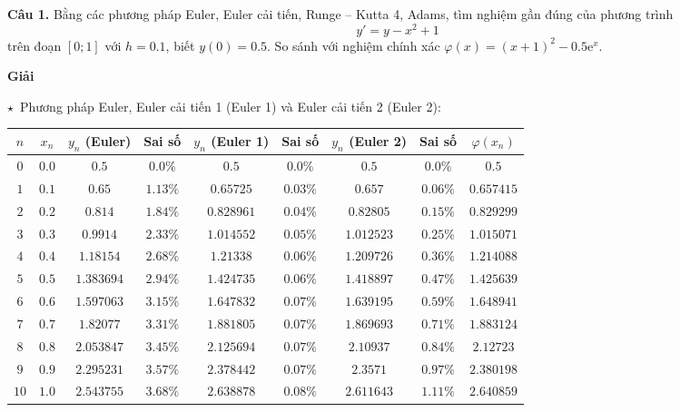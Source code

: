 \textbf{Câu 1.} Bằng các phương pháp Euler, Euler cải tiến, Runge – Kutta 4, Adams, tìm nghiệm gần đúng của phương trình $$y'=y-x^2+1$$ trên đoạn $[0;1]$ với $h=0.1$, biết $y(0)=0.5$. So sánh với nghiệm chính xác $\varphi(x)=(x+1)^2-0.5\mathrm{e}^x$.\par
\textbf{Giải}\par
$\star$~Phương pháp Euler, Euler cải tiến 1 (Euler 1) và Euler cải tiến 2 (Euler 2):
\begin{longtable}{|c|c|c|c|c|c|c|c|c|}\hline
	$n$  & $x_n$ & $y_n$ (Euler) & Sai số & $y_n$ (Euler 1) & Sai số & $y_n$ (Euler 2)     & Sai số   & $\varphi(x_n)$ \\\hline
	\endhead
	$0$  & $0.0$ & $0.5$         & $0.0\%$  & $0.5$           & $0.0\%$  & $0.5$           & $0.0\%$  & $0.5$          \\\hline
	$1$  & $0.1$ & $0.65$        & $1.13\%$ & $0.65725$       & $0.03\%$ & $0.657$         & $0.06\%$ & $0.657415$     \\\hline
	$2$  & $0.2$ & $0.814$       & $1.84\%$ & $0.828961$      & $0.04\%$ & $0.82805$       & $0.15\%$ & $0.829299$     \\\hline
	$3$  & $0.3$ & $0.9914$      & $2.33\%$ & $1.014552$      & $0.05\%$ & $1.012523$      & $0.25\%$ & $1.015071$     \\\hline
	$4$  & $0.4$ & $1.18154$     & $2.68\%$ & $1.21338$       & $0.06\%$ & $1.209726$      & $0.36\%$ & $1.214088$     \\\hline
	$5$  & $0.5$ & $1.383694$    & $2.94\%$ & $1.424735$      & $0.06\%$ & $1.418897$      & $0.47\%$ & $1.425639$     \\\hline
	$6$  & $0.6$ & $1.597063$    & $3.15\%$ & $1.647832$      & $0.07\%$ & $1.639195$      & $0.59\%$ & $1.648941$     \\\hline
	$7$  & $0.7$ & $1.82077$     & $3.31\%$ & $1.881805$      & $0.07\%$ & $1.869693$      & $0.71\%$ & $1.883124$     \\\hline
	$8$  & $0.8$ & $2.053847$    & $3.45\%$ & $2.125694$      & $0.07\%$ & $2.10937$       & $0.84\%$ & $2.12723$      \\\hline
	$9$  & $0.9$ & $2.295231$    & $3.57\%$ & $2.378442$      & $0.07\%$ & $2.3571$        & $0.97\%$ & $2.380198$     \\\hline
	$10$ & $1.0$ & $2.543755$    & $3.68\%$ & $2.638878$      & $0.08\%$ & $2.611643$      & $1.11\%$ & $2.640859$     \\\hline
\end{longtable}

